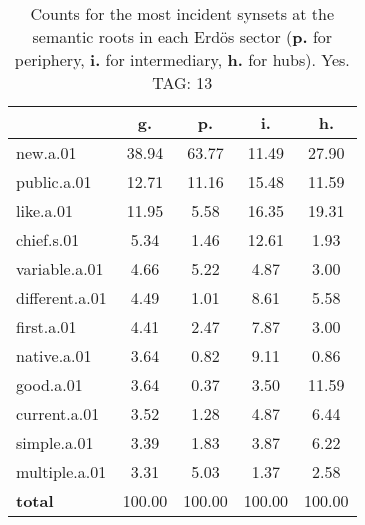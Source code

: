 \begin{table}[h!]
\begin{center}
\begin{tabular}{| l | c | c | c | c |}\hline
 & g. & p. & i. & h. \\\hline
new.a.01 & 38.94  & 63.77  & 11.49  & 27.90 \\\hline
public.a.01 & 12.71  & 11.16  & 15.48  & 11.59 \\\hline
like.a.01 & 11.95  & 5.58  & 16.35  & 19.31 \\\hline
chief.s.01 & 5.34  & 1.46  & 12.61  & 1.93 \\\hline
variable.a.01 & 4.66  & 5.22  & 4.87  & 3.00 \\\hline
different.a.01 & 4.49  & 1.01  & 8.61  & 5.58 \\\hline
first.a.01 & 4.41  & 2.47  & 7.87  & 3.00 \\\hline
native.a.01 & 3.64  & 0.82  & 9.11  & 0.86 \\\hline
good.a.01 & 3.64  & 0.37  & 3.50  & 11.59 \\\hline
current.a.01 & 3.52  & 1.28  & 4.87  & 6.44 \\\hline
simple.a.01 & 3.39  & 1.83  & 3.87  & 6.22 \\\hline
multiple.a.01 & 3.31  & 5.03  & 1.37  & 2.58 \\\hline
{{\bf total}} & 100.00  & 100.00  & 100.00  & 100.00 \\\hline
\end{tabular}
\caption{Counts for the most incident synsets at the semantic roots in each Erd\"os sector ({\bf p.} for periphery, {\bf i.} for intermediary, {\bf h.} for hubs). Yes. TAG: 13}
\end{center}
\end{table}